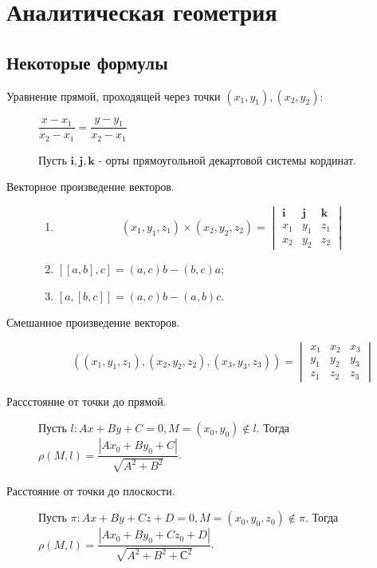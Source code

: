 \documentclass[a4paper,12pt]{scrartcl}
\begin{document}
\section{Аналитическая геометрия}
\subsection{Некоторые формулы}
\begin{description}
 \item [Уравнение прямой, проходящей через точки $(x_1,y_1),(x_2,y_2)$:] $\dfrac{x-x_1}{x_2-x_1} = \dfrac{y-y_1}{x_2-x_1}$

Пусть $\mathbf{i,j,k}$ - орты прямоугольной декартовой системы кординат.

\item [Векторное произведение векторов.]
\begin{enumerate}
 \item $$(x_1,y_1,z_1)\times(x_2,y_2,z_2)=\begin{vmatrix} 
   \mathbf{i} & \mathbf{j} & \mathbf{k} \\ x_1 & y_1 & z_1 \\ x_2 & y_2 & z_2
  \end{vmatrix}
 $$
\item $[[a,b],c] = (a,c)b - (b,c)a$;
\item $[a,[b,c]] = (a,c)b - (a,b)c$.
\end{enumerate}

\item [Смешанное произведение векторов.] 
$$((x_1,y_1,z_1),(x_2,y_2,z_2),(x_3,y_3,z_3))=\begin{vmatrix} 
   x_1 & x_2 & x_3 \\ y_1 & y_2 & y_3 \\ z_1 & z_2 & z_3
  \end{vmatrix}
 $$
\item [Рассстояние от точки до прямой.] Пусть $l: Ax+By+C =0, M = (x_0,y_0) \notin l.$ Тогда $\rho(M,l) = \dfrac{|Ax_0 + By_0 +C|}{\sqrt{A^2 + B^2}}$.
\item [Расстояние от точки до плоскости.] Пусть $\pi: Ax+By+Cz +D =0, M = (x_0,y_0,z_0) \notin \pi. $ Тогда $\rho(M,l) = \dfrac{|Ax_0 + By_0 + Cz_0 + D|}{\sqrt{A^2 + B^2 + С^2}}$.
\end{description}
\end{document}
